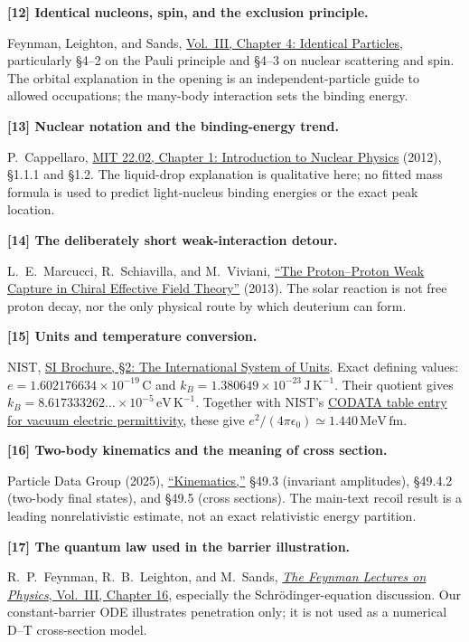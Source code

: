 \documentclass[11pt]{article}
\newcommand{\source}[3]{\par\medskip\hypertarget{src#1}{}\textbf{[#1] #2}\par\nopagebreak #3\par}
\begin{document}
\source{12}{Identical nucleons, spin, and the exclusion principle.}{Feynman,
Leighton, and Sands,
\href{https://www.feynmanlectures.caltech.edu/III_04.html}{Vol.~III,
Chapter 4: Identical Particles}, particularly \S4--2 on the Pauli principle
and \S4--3 on nuclear scattering and spin. The orbital explanation in the
opening is an independent-particle guide to allowed occupations; the
many-body interaction sets the binding energy.}

\source{13}{Nuclear notation and the binding-energy trend.}{P.~Cappellaro,
\href{https://ocw.mit.edu/courses/22-02-introduction-to-applied-nuclear-physics-spring-2012/d0d046f78c917f107d925f11ac862ae4_MIT22_02S12_lec_ch1.pdf}{
MIT 22.02, Chapter 1: Introduction to Nuclear Physics} (2012), \S1.1.1 and
\S1.2. The liquid-drop explanation is qualitative here; no fitted mass formula
is used to predict light-nucleus binding energies or the exact peak location.}

\source{14}{The deliberately short weak-interaction detour.}{L.~E.~Marcucci,
R.~Schiavilla, and M.~Viviani,
\href{https://arxiv.org/abs/1303.3124}{``The Proton--Proton Weak Capture in
Chiral Effective Field Theory''} (2013). The solar reaction is not free proton
decay, nor the only physical route by which deuterium can form.}

\source{15}{Units and temperature conversion.}{NIST,
\href{https://www.nist.gov/pml/special-publication-330/sp-330-section-2}{
SI Brochure, \S2: The International System of Units}. Exact defining values:
$e=1.602176634\times10^{-19}\,\mathrm C$ and
$k_B=1.380649\times10^{-23}\,\mathrm{J\,K^{-1}}$.
Their quotient gives $k_B=8.617333262\ldots\times10^{-5}\,\mathrm{eV\,K^{-1}}$.
Together with NIST's
\href{https://physics.nist.gov/cuu/Constants/Table/allascii.txt}{CODATA table
entry for vacuum electric permittivity},
these give $e^2/(4\pi\epsilon_0)\simeq1.440\,\mathrm{MeV\,fm}$.}

\source{16}{Two-body kinematics and the meaning of cross section.}{Particle
Data Group (2025), \href{https://pdg.lbl.gov/2025/reviews/rpp2025-rev-kinematics.pdf}{
``Kinematics,''} \S49.3 (invariant amplitudes), \S49.4.2 (two-body final states),
and \S49.5 (cross sections). The main-text recoil result is a leading
nonrelativistic estimate, not an exact relativistic energy partition.}

\source{17}{The quantum law used in the barrier illustration.}{R.~P.~Feynman,
R.~B.~Leighton, and M.~Sands,
\href{https://www.feynmanlectures.caltech.edu/III_16.html}{\emph{The Feynman
Lectures on Physics}, Vol.~III, Chapter 16}, especially the Schr\"odinger-equation
discussion. Our constant-barrier ODE illustrates penetration only; it is not
used as a numerical D--T cross-section model.}
\end{document}
